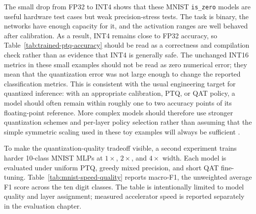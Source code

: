 \documentclass[a4paper, 12pt, titlepage]{article}
\begin{document}
\begin{table}[H]
    \centering
    \footnotesize
    \caption{Trained MNIST \texttt{is\_zero} accuracy after post-training quantization. Balanced accuracy uses an equal zero/nonzero test split; full-test accuracy uses the original MNIST test distribution.}
    \label{tab:trained-ptq-accuracy}
\end{table}

The small drop from FP32 to INT4 shows that these MNIST \texttt{is\_zero} models are useful hardware test cases but weak precision-stress tests. The task is binary, the networks have enough capacity for it, and the activation ranges are well behaved after calibration. As a result, INT4 remains close to FP32 accuracy, so Table~\ref{tab:trained-ptq-accuracy} should be read as a correctness and compilation check rather than as evidence that INT4 is generally safe.
The unchanged INT16 metrics in these small examples should not be read as zero numerical error; they mean that the quantization error was not large enough to change the reported classification metrics.
This is consistent with the usual engineering target for quantized inference: with an appropriate calibration, PTQ, or QAT policy, a model should often remain within roughly one to two accuracy points of its floating-point reference. More complex models should therefore use stronger quantization schemes and per-layer policy selection rather than assuming that the simple symmetric scaling used in these toy examples will always be sufficient \cite{kim2021ibert,xiao2023smoothquant}.

To make the quantization-quality tradeoff visible, a second experiment trains harder 10-class MNIST MLPs at \(1\times\), \(2\times\), and \(4\times\) width. Each model is evaluated under uniform PTQ, greedy mixed precision, and short QAT fine-tuning. Table~\ref{tab:mnist-speed-quality} reports macro-F1, the unweighted average F1 score across the ten digit classes. The table is intentionally limited to model quality and layer assignment; measured accelerator speed is reported separately in the evaluation chapter.
\end{document}
